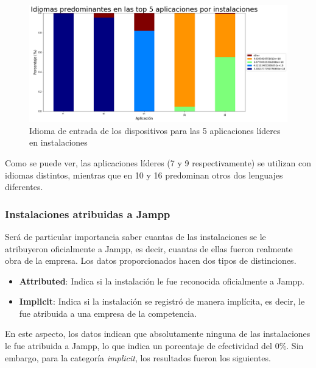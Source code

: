 \documentclass[a4paper, 12pt]{article}
\begin{document}
		\FloatBarrier
		\begin{figure}[h]
			\centering
			\includegraphics[width=\textwidth]{images/installs/idiomasapps.png}
			\caption{Idioma de entrada de los dispositivos para las 5 aplicaciones líderes en instalaciones}
		\end{figure}
		\FloatBarrier
		
		Como se puede ver, las aplicaciones líderes (7 y 9 respectivamente) se utilizan con idiomas distintos, mientras que en 10 y 16 predominan otros dos lenguajes diferentes.
		
		
	\subsubsection{Instalaciones atribuidas a Jampp}
		Será de particular importancia saber cuantas de las instalaciones se le atribuyeron oficialmente a Jampp, es decir, cuantas de ellas fueron realmente obra de la empresa. Los datos proporcionados hacen dos tipos de distinciones.
		
		\begin{itemize}
		\item \textbf{Attributed}: Indica si la instalación le fue reconocida oficialmente a Jampp.
		\item \textbf{Implicit}: Indica si la instalación se registró de manera implícita, es decir, le fue atribuida a una empresa de la competencia.
		\end{itemize}
		
		En este aspecto, los datos indican que absolutamente ninguna de las instalaciones le fue atribuida a Jampp, lo que indica un porcentaje de efectividad del 0\%. Sin embargo, para la categoría \textit{implicit}, los resultados fueron los siguientes.
		
\end{document}
